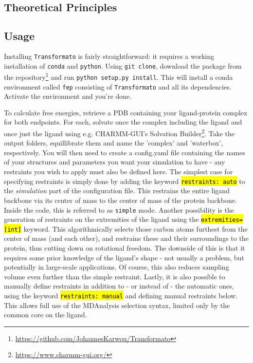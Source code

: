 \documentclass[oneside]{scrreprt}
\newcommand{\code}[1]{\texttt{\hl{#1}}}
\begin{document}
\subsection{Theoretical Principles}
\subsection{Usage}
Installing \texttt{Transformato} is fairly straightforward: it requires a working installation of \texttt{conda} and \texttt{python}. Using \texttt{git clone}, download the package from the repository\footnote{\url{https://github.com/JohannesKarwou/Transformato}} and run \texttt{python setup.py install}. This will install a conda environment called \texttt{fep} consisting of \texttt{Transformato} and all its dependencies. Activate the environment and you're done.

To calculate free energies, retrieve a PDB containing your ligand-protein complex for both endpoints. For each, solvate once the complex including the ligand and once just the ligand using e.g. CHARMM-GUI's Solvation Builder\footnote{\url{https://www.charmm-gui.org/}}. Take the output folders, equillibrate them and name the 'complex' and 'waterbox', respectively. You will then need to create a config.yaml file containing the names of your structures and parameters you want your simulation to have - any restraints you wish to apply must also be defined here. The simplest case for specifying restraints is simply done by adding the keyword \code{restraints: auto} to the \emph{simulation} part of the configuration file. This restrains the entire ligand backbone via its center of mass to the center of mass of the protein backbone. Inside the code, this is referred to as \texttt{simple} mode. Another possibility is the generation of restraints on the extremities of the ligand using the \code{extremities=[int]} keyword. This algorithmically selects those carbon atoms furthest from the center of mass (and each other), and restrains these and their surroundings to the protein, thus cutting down on rotational freedom. The downside of this is that it requires some prior knowledge of the ligand's shape - not usually a problem, but potentially in large-scale applications. Of course, this also reduces sampling volume even further than the simple restraint. Lastly, it is also possible to manually define restraints in addition to - or instead of - the automatic ones, using the keyword \code{restraints: manual} and defining manual restraints below. This allows full use of the MDAnalysis\supercite{agrawal2011,oliver_beckstein-proc-scipy-2016} selection syntax, limited only by the common core on the ligand.
\end{document}
